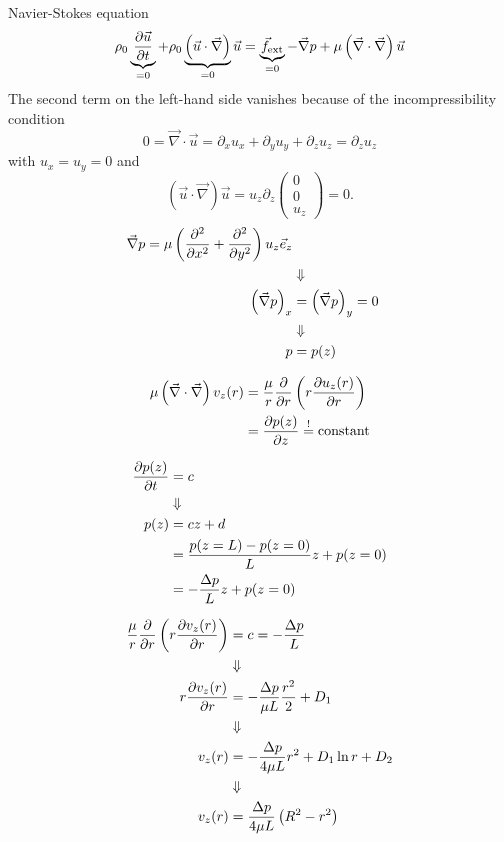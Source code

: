 Navier-Stokes equation
\begin{equation}
\rho_0\underbrace{\frac{\partial \vec{u}}{\partial t}}_{=0}+\rho_0\underbrace{\left(\vec{u}\cdot\vec{\nabla}\right)}_{=0}\vec{u} = \underbrace{\vec{f}_\mathrm{ext}}_{=0}-\vec{\nabla}p+\mu\left(\vec{\nabla}\cdot\vec{\nabla}\right)\vec{u}
\end{equation}
The second term on the left-hand side vanishes because of the incompressibility condition
\begin{equation}
0=\vec{\nabla}\cdot\vec{u}=\partial_xu_x+\partial_yu_y+\partial_zu_z = \partial_zu_z
\end{equation}
with $u_x=u_y=0$ and
\begin{equation}
\left(\vec{u}\cdot\vec{\nabla}\right)\vec{u} = u_z\partial_z
\begin{pmatrix}
0\\0\\u_z
\end{pmatrix} = 0.
\end{equation}
\begin{align}
\vec{\nabla}p = \mu\left(\frac{\partial^2 }{\partial x^2}+\frac{\partial^2 }{\partial y^2}\right)u_z\vec{e}_z\\
&\Downarrow\notag\\
\left(\vec{\nabla}p\right)_x &= \left(\vec{\nabla}p\right)_y = 0 \\
&\Downarrow\notag\\
p &= p(z)
\end{align}

\begin{align}
\mu\left(\vec{\nabla}\cdot\vec{\nabla}\right) v_z(r) &= \frac{\mu}{r}\frac{\partial }{\partial r}\left(r\frac{\partial u_z(r)}{\partial r}\right) \\
&= \frac{\partial p(z)}{\partial z} \overset{!}{=} \mathrm{constant}
\end{align}

\begin{align}
\frac{\partial p(z)}{\partial t}&=c \\
&\Downarrow\notag\\
p(z) &= cz+d \\
&= \frac{p(z=L)-p(z=0)}{L}z+p(z=0)\\
&= -\frac{\Delta p}{L}z + p(z=0)
\end{align}

\begin{align}
\frac{\mu}{r}\frac{\partial }{\partial r}\left(r\frac{\partial v_z(r)}{\partial r}\right) &= c = -\frac{\Delta p}{L} \\
&\Downarrow\notag\\
r\frac{\partial v_z(r)}{\partial r} &= -\frac{\Delta p}{\mu L}\frac{r^2}{2} + D_1 \\
&\Downarrow\notag\\
v_z(r) &= -\frac{\Delta p}{4\mu L}r^2 + D_1 \ln r + D_ 2 \\
&\Downarrow\notag\\
v_z(r) &= \frac{\Delta p}{4\mu L}\left( R^2 - r^2\right)
\end{align}

